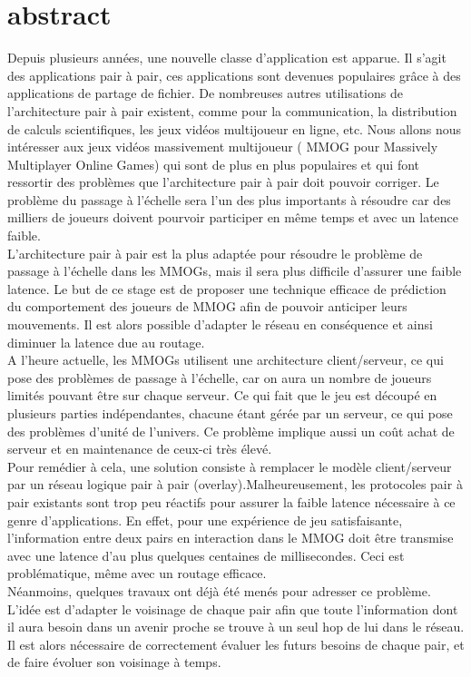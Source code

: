 \section{abstract}

	Depuis plusieurs années, une nouvelle classe d'application est apparue. Il s'agit des applications pair à pair, ces applications sont devenues populaires grâce à des applications de partage de fichier. De nombreuses autres utilisations de l'architecture pair à pair existent, comme pour la communication, la distribution de calculs scientifiques, les jeux vidéos multijoueur en ligne, etc. Nous allons nous intéresser aux jeux vidéos massivement multijoueur ( MMOG pour Massively Multiplayer Online Games) qui sont de plus en plus populaires et qui font ressortir des problèmes que l'architecture pair à pair doit pouvoir corriger. Le problème du passage à l'échelle sera l'un des plus importants à résoudre car des milliers de joueurs doivent pourvoir participer en même temps et avec un latence faible.\\ 
	L'architecture pair à pair est la plus adaptée pour résoudre le problème de passage à l'échelle dans les MMOGs, mais il sera plus difficile d'assurer une faible latence. Le but de ce stage est de proposer une technique efficace de prédiction du comportement des joueurs de MMOG afin de pouvoir anticiper leurs mouvements. Il est alors possible d’adapter le réseau en conséquence et ainsi diminuer la latence due au routage.\\ 
	A l'heure actuelle, les MMOGs utilisent une architecture client/serveur, ce qui pose des problèmes de passage à  l'échelle, car on aura un nombre de joueurs limités pouvant être sur chaque serveur. Ce qui fait que le jeu est découpé en plusieurs parties indépendantes, chacune étant gérée par un serveur, ce qui pose des problèmes d'unité de l'univers. Ce problème implique aussi un coût achat de serveur et en maintenance de ceux-ci très élevé.\\
	Pour remédier à cela, une solution consiste à remplacer le modèle client/serveur par un réseau logique pair à pair (overlay).Malheureusement, les protocoles pair à pair existants sont trop peu réactifs pour assurer la faible latence nécessaire à ce genre d’applications. En effet, pour une expérience de jeu satisfaisante, l’information entre deux pairs en interaction dans le MMOG doit être transmise avec une latence d’au plus quelques centaines de millisecondes. Ceci est problématique, même avec un routage efficace.\\
	Néanmoins, quelques travaux ont déjà été menés pour adresser ce problème. L’idée est d’adapter le voisinage de chaque pair afin que toute l’information dont il aura besoin dans un avenir proche se trouve à un seul hop de lui dans le réseau. Il est alors nécessaire de correctement évaluer les futurs besoins de chaque pair, et de faire évoluer son voisinage à temps.
